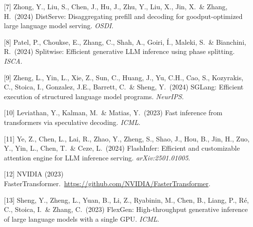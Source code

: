 \documentclass{article}
\begin{document}
[7] Zhong, Y., Liu, S., Chen, J., Hu, J., Zhu, Y., Liu, X., Jin, X.\ \& Zhang, H.\ (2024) DistServe: Disaggregating prefill and decoding for goodput-optimized large language model serving. \emph{OSDI}.

[8] Patel, P., Choukse, E., Zhang, C., Shah, A., Goiri, \'I., Maleki, S.\ \& Bianchini, R.\ (2024) Splitwise: Efficient generative LLM inference using phase splitting. \emph{ISCA}.

[9] Zheng, L., Yin, L., Xie, Z., Sun, C., Huang, J., Yu, C.H., Cao, S., Kozyrakis, C., Stoica, I., Gonzalez, J.E., Barrett, C.\ \& Sheng, Y.\ (2024) SGLang: Efficient execution of structured language model programs. \emph{NeurIPS}.

[10] Leviathan, Y., Kalman, M.\ \& Matias, Y.\ (2023) Fast inference from transformers via speculative decoding. \emph{ICML}.

[11] Ye, Z., Chen, L., Lai, R., Zhao, Y., Zheng, S., Shao, J., Hou, B., Jin, H., Zuo, Y., Yin, L., Chen, T.\ \& Ceze, L.\ (2024) FlashInfer: Efficient and customizable attention engine for LLM inference serving. \emph{arXiv:2501.01005}.

[12] NVIDIA (2023) FasterTransformer.\ \url{https://github.com/NVIDIA/FasterTransformer}.

[13] Sheng, Y., Zheng, L., Yuan, B., Li, Z., Ryabinin, M., Chen, B., Liang, P., R\'e, C., Stoica, I.\ \& Zhang, C.\ (2023) FlexGen: High-throughput generative inference of large language models with a single GPU. \emph{ICML}.
\end{document}
